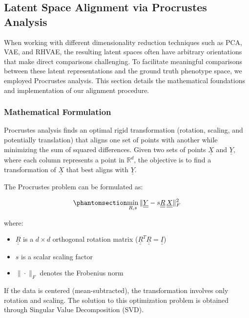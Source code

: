 \documentclass[
]{scrartcl}
\providecommand{\tightlist}{%
  \setlength{\itemsep}{0pt}\setlength{\parskip}{0pt}}
\begin{document}
\begin{refsection}
\subsection{Latent Space Alignment via Procrustes
Analysis}\label{latent-space-alignment-via-procrustes-analysis}

When working with different dimensionality reduction techniques such as
PCA, VAE, and RHVAE, the resulting latent spaces often have arbitrary
orientations that make direct comparisons challenging. To facilitate
meaningful comparisons between these latent representations and the
ground truth phenotype space, we employed Procrustes analysis. This
section details the mathematical foundations and implementation of our
alignment procedure.

\subsubsection{Mathematical Formulation}\label{mathematical-formulation}

Procrustes analysis finds an optimal rigid transformation (rotation,
scaling, and potentially translation) that aligns one set of points with
another while minimizing the sum of squared differences. Given two sets
of points \(\underline{\underline{X}}\) and
\(\underline{\underline{Y}}\), where each column represents a point in
\(\mathbb{R}^d\), the objective is to find a transformation of
\(\underline{\underline{X}}\) that best aligns with
\(\underline{\underline{Y}}\).

The Procrustes problem can be formulated as:

\begin{equation}\phantomsection\label{eq-procrustes}{
\min_{R, s} \|
    \underline{\underline{Y}} - 
    s\underline{\underline{R}}\,\underline{\underline{X}}
\|_F^2
}\end{equation}

where:

\begin{itemize}
\tightlist
\item
  \(\underline{\underline{R}}\) is a \(d \times d\) orthogonal rotation
  matrix (\(\underline{\underline{R}}^T\underline{\underline{R}} =
  \underline{\underline{I}}\))
\item
  \(s\) is a scalar scaling factor
\item
  \(\|\cdot\|_F\) denotes the Frobenius norm
\end{itemize}

If the data is centered (mean-subtracted), the transformation involves
only rotation and scaling. The solution to this optimization problem is
obtained through Singular Value Decomposition (SVD).


\end{refsection}
\end{document}
